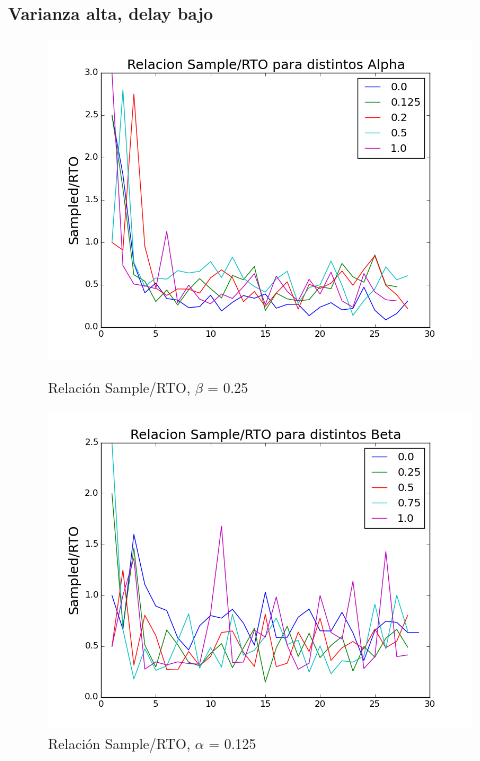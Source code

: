 \subsubsection{Varianza alta, delay bajo}

\begin{figure}[H]
\begin{minipage}{0.5\linewidth}
\includegraphics[width=\linewidth]{../graficos/alphad01var5drop50.png}
\caption{Relación Sample/RTO, $\beta$ = 0.25}\label{fig:alpha-var5-drop50}
\end{minipage}
\hfill
\begin{minipage}{0.5\linewidth}
\includegraphics[width=\linewidth]{../graficos/betad01var5drop50.png}
\caption{Relación Sample/RTO, $\alpha$ = 0.125}\label{fig:beta-var5-drop50}
\end{minipage}
\end{figure}

